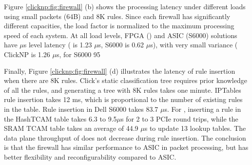 Figure \ref {clicknp:fig:firewall} (b) shows the processing latency under different loads using small packets (64B) and 8K rules. Since each firewall has significantly different capacities, the load factor is normalized to the maximum processing speed of each system. At all load levels, FPGA (\name{}) and ASIC (S6000) solutions have $\mu$s level latency (\name{} is 1.23 $\mu$s, S6000 is 0.62 $\mu$s), with very small variance ( ClickNP is 1.26 $\mu$s, for S6000 95%

Finally, Figure \ref {clicknp:fig:firewall} (d) illustrates the latency of rule insertion when there are 8K rules. Click's static classification tree requires prior knowledge of all the rules, and generating a tree with 8K rules takes one minute. IPTables rule insertion takes 12 ms, which is proportional to the number of existing rules in the table. Rule insertion in Dell S6000 takes 83.7 $\mu$s. For \name{}, inserting a rule in the HashTCAM table takes 6.3 to 9.5$\mu$s for 2 to 3 PCIe round trips, while the SRAM TCAM table takes an average of 44.9 $\mu$s to update 13 lookup tables. The data plane throughput of \name does not decrease during rule insertion. The conclusion is that the \name{} firewall has similar performance to ASIC in packet processing, but has better flexibility and reconfigurability compared to ASIC.

